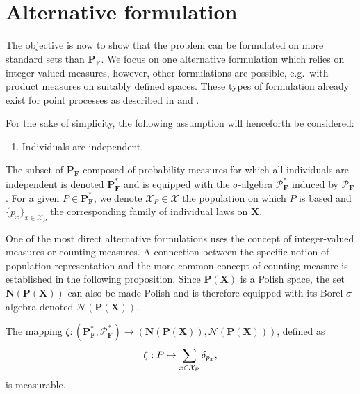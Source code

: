 \documentclass{aptpub}
\numberwithin{equation}{section}
\begin{document}
\section{Alternative formulation}
\label{sec:altFormulations}

The objective is now to show that the problem can be formulated on more standard sets than ${\mathbf{P}}_{\mathbf{F}}$. We focus on one alternative formulation which relies on integer-valued measures, however, other formulations are possible, e.g.\ with product measures on suitably defined spaces. These types of formulation already exist for point processes as described in \cite{Moyal1962} and \cite{Ito2013}.

For the sake of simplicity, the following assumption will henceforth be considered:
\begin{enumerate}[label=\bfseries A.\arabic*,series=hyp]
\item \label{hyp:independence} Individuals are independent.
\end{enumerate}
The subset of ${\mathbf{P}}_{\mathbf{F}}$ composed of probability measures for which all individuals are independent is denoted ${\mathbf{P}}^*_{\mathbf{F}}$ and is equipped with the $\sigma$-algebra ${\mathcal{P}}^*_{\mathbf{F}}$ induced by ${\mathcal{P}}_{\mathbf{F}}$. For a given $P \in {\mathbf{P}}^*_{\mathbf{F}}$, we denote ${\mathcal{X}}_P \in {\boldsymbol{\mathcal{X}}}$ the population on which $P$ is based and $\{p_x\}_{x \in {\mathcal{X}}_P}$ the corresponding family of individual laws on ${\mathbf{X}}$.

One of the most direct alternative formulations uses the concept of integer-valued measures or counting measures. A connection between the specific notion of population representation and the more common concept of counting measure is established in the following proposition. Since ${\mathbf{P}}({\mathbf{X}})$ is a Polish space, the set ${\mathbf{N}}({\mathbf{P}}({\mathbf{X}}))$ can also be made Polish and is therefore equipped with its Borel $\sigma$-algebra denoted ${\mathcal{N}}({\mathbf{P}}({\mathbf{X}}))$.

\begin{theorem}
\label{thm:popProcToMeasure}
The mapping  $\zeta : ({\mathbf{P}}^*_{\mathbf{F}},{\mathcal{P}}^*_{\mathbf{F}}) \to ({\mathbf{N}}({\mathbf{P}}({\mathbf{X}})),{\mathcal{N}}({\mathbf{P}}({\mathbf{X}})))$, defined as
{\begin{equation}\label{{eq:prop:popProcToMeasure}}{
\zeta : P \mapsto \sum_{x \in {\mathcal{X}}_P} \delta_{ p_x },
}\end{equation}}
is measurable.
\end{theorem}
\end{document}
